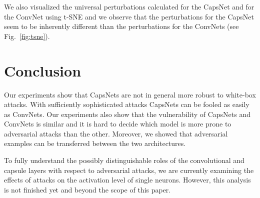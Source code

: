 \documentclass{article}
\begin{document}
We also visualized the universal perturbations calculated for the
CapsNet and for the ConvNet using t-SNE \cite{tsne} and we observe
that the perturbations for the CapsNet seem to be inherently different
than the perturbations for the ConvNets (see Fig.~\ref{fig:tsne}).

\section{Conclusion}
Our experiments show that CapsNets are not in general more robust to
white-box attacks. With sufficiently sophisticated attacks CapsNets
can be fooled as easily as ConvNets.  Our experiments also show that
the vulnerability of CapsNets and ConvNets is similar and it is hard
to decide which model is more prone to adversarial attacks than the
other. Moreover, we showed that adversarial examples can be transferred
between the two architectures.

To fully understand the possibly distinguishable roles of the convolutional and capsule layers with respect to adversarial attacks, we are currently examining the effects of attacks on the activation level of single neurons.  However, this analysis is not finished yet and beyond the scope of this paper.






\end{document}

